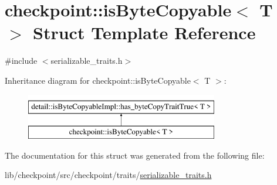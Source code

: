 \hypertarget{structcheckpoint_1_1is_byte_copyable}{}\section{checkpoint\+:\+:is\+Byte\+Copyable$<$ T $>$ Struct Template Reference}
\label{structcheckpoint_1_1is_byte_copyable}


{\ttfamily \#include $<$serializable\+\_\+traits.\+h$>$}

Inheritance diagram for checkpoint\+:\+:is\+Byte\+Copyable$<$ T $>$\+:\begin{figure}[H]
\begin{center}
\leavevmode
\includegraphics[height=2.000000cm]{structcheckpoint_1_1is_byte_copyable}
\end{center}
\end{figure}


The documentation for this struct was generated from the following file\+:\begin{DoxyCompactItemize}
\item 
lib/checkpoint/src/checkpoint/traits/\hyperlink{serializable__traits_8h}{serializable\+\_\+traits.\+h}\end{DoxyCompactItemize}
